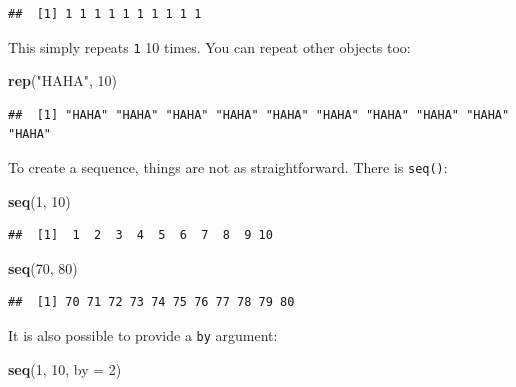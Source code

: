 \documentclass[]{gitbook}
\newenvironment{Shaded}{\begin{snugshade}}{\end{snugshade}}
\newcommand{\DataTypeTok}[1]{\textcolor[rgb]{0.13,0.29,0.53}{#1}}
\newcommand{\DecValTok}[1]{\textcolor[rgb]{0.00,0.00,0.81}{#1}}
\newcommand{\KeywordTok}[1]{\textcolor[rgb]{0.13,0.29,0.53}{\textbf{#1}}}
\newcommand{\NormalTok}[1]{#1}
\newcommand{\StringTok}[1]{\textcolor[rgb]{0.31,0.60,0.02}{#1}}
\begin{document}
\begin{verbatim}
##  [1] 1 1 1 1 1 1 1 1 1 1
\end{verbatim}

This simply repeats \texttt{1} 10 times. You can repeat other objects too:

\begin{Shaded}
\begin{Highlighting}[]
\KeywordTok{rep}\NormalTok{(}\StringTok{"HAHA"}\NormalTok{, }\DecValTok{10}\NormalTok{)}
\end{Highlighting}
\end{Shaded}

\begin{verbatim}
##  [1] "HAHA" "HAHA" "HAHA" "HAHA" "HAHA" "HAHA" "HAHA" "HAHA" "HAHA" "HAHA"
\end{verbatim}

To create a sequence, things are not as straightforward. There is \texttt{seq()}:

\begin{Shaded}
\begin{Highlighting}[]
\KeywordTok{seq}\NormalTok{(}\DecValTok{1}\NormalTok{, }\DecValTok{10}\NormalTok{)}
\end{Highlighting}
\end{Shaded}

\begin{verbatim}
##  [1]  1  2  3  4  5  6  7  8  9 10
\end{verbatim}

\begin{Shaded}
\begin{Highlighting}[]
\KeywordTok{seq}\NormalTok{(}\DecValTok{70}\NormalTok{, }\DecValTok{80}\NormalTok{)}
\end{Highlighting}
\end{Shaded}

\begin{verbatim}
##  [1] 70 71 72 73 74 75 76 77 78 79 80
\end{verbatim}

It is also possible to provide a \texttt{by} argument:

\begin{Shaded}
\begin{Highlighting}[]
\KeywordTok{seq}\NormalTok{(}\DecValTok{1}\NormalTok{, }\DecValTok{10}\NormalTok{, }\DataTypeTok{by =} \DecValTok{2}\NormalTok{)}
\end{Highlighting}
\end{Shaded}
\end{document}
